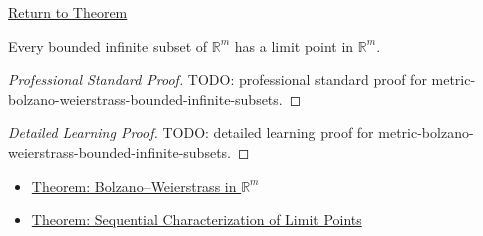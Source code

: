 \newpage
{}
\label{prf:metric-bolzano-weierstrass-bounded-infinite-subsets}

\begin{remark*}[Return]
\hyperref[thm:metric-bolzano-weierstrass-bounded-infinite-subsets]{Return to Theorem}
\end{remark*}

\begin{theorem*}
Every bounded infinite subset of \(\mathbb{R}^m\) has a limit point in
\(\mathbb{R}^m\).
\end{theorem*}

\begin{proof}[Professional Standard Proof]
\LRAProofBodyStart
TODO: professional standard proof for metric-bolzano-weierstrass-bounded-infinite-subsets.
\end{proof}

\begin{proof}[Detailed Learning Proof]
\LRAProofBodyStart
TODO: detailed learning proof for metric-bolzano-weierstrass-bounded-infinite-subsets.
\end{proof}

\begin{remark*}
\end{remark*}

\begin{dependencies}
\begin{itemize}
  \item \hyperref[thm:metric-euclidean-bolzano-weierstrass]{Theorem: Bolzano--Weierstrass in \(\mathbb{R}^m\)}
  \item \hyperref[thm:metric-limit-point-sequential-characterization]{Theorem: Sequential Characterization of Limit Points}
\end{itemize}
\end{dependencies}

\clearpage
